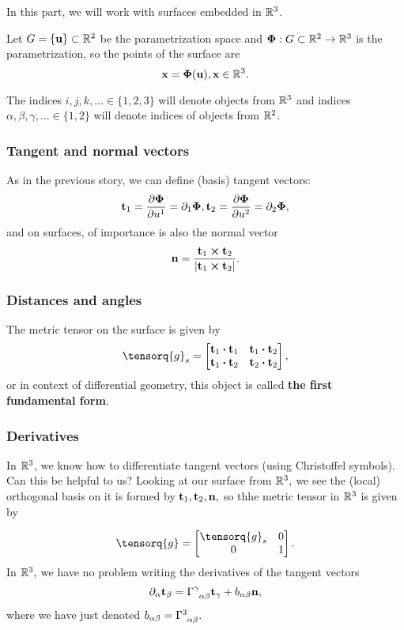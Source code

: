 \documentclass[../main.tex]{subfiles}
\begin{document}
In this part, we will work with surfaces embedded in ${\mathbb R}^3$.

Let $G = \{\vb{u}\} \subset {\mathbb R}^2 $ be the parametrization space and $\vb*{\Phi}:G \subset {\mathbb R}^2 \to {\mathbb R}^3$ is the parametrization, so the points of the surface are
\[
	\vb{x}=\vb*{\Phi}\qty(\vb{u}), \vb{x} \in {\mathbb R}^3.
\]

\begin{definition}
	The indices $i,j,k, \dots \in \{1,2,3\}$ will denote objects from ${\mathbb R}^3$ and indices $\alpha, \beta, \gamma, \dots \in \{1,2\}$ will denote indices of objects from ${\mathbb R}^2$.
\end{definition}

\subsubsection{Tangent and normal vectors}
\label{sec:tangent_normal_vectors}
As in the previous story, we can define (basis) tangent vectors:
\[
	\vb{t}_1 = \pdv{\vb*{\Phi}}{u^1} = \partial_{1} \vb*{\Phi}, \vb{t}_2 = \pdv{\vb*{\Phi}}{u^2} = \partial_{2} \vb*{\Phi},
\]
and on surfaces, of importance is also the normal vector
\[
	\vb{n}=\frac{\vb{t}_1 \cross \vb{t}_2}{\abs{\vb{t}_1 \cross \vb{t}_2}}.
\]

\subsubsection{Distances and angles}
\label{sec:distances_angles}

The metric tensor on the surface is given by
\[
	\tensorq{g}_s = \begin{bmatrix} \vb{t}_1 \vdot \vb{t}_1 & \vb{t}_1 \vdot \vb{t}_2 \\ \vb{t}_1 \vdot \vb{t}_2 & \vb{t}_2 \vdot \vb{t}_2 \end{bmatrix},
\]
or in context of differential geometry, this object is called \textbf{the first fundamental form}.

\subsubsection{Derivatives}
\label{sec:derivatives_on_surfaces}
In ${\mathbb R}^3$, we know how to differentiate tangent vectors (using Christoffel symbols). Can this be helpful to us?
Looking at our surface from ${\mathbb R}^{3},$ we see the (local) orthogonal basis on it is formed by $\vb{t}_1, \vb{t}_2, \vb{n},$ so thhe metric tensor in ${\mathbb R}^3$ is given by 

\[
	\tensorq{g} = 
	\begin{bmatrix}
		\tensorq{g}_s & 0 \\
		0 & 1 
	\end{bmatrix}.
\]
In ${\mathbb R}^{3},$ we have no problem writing the derivatives of the tangent vectors
\[
	\partial_{\alpha} \vb{t}_{\beta} = \Gamma \indices{^\gamma_{\alpha \beta}} \vb{t}_{\gamma}+b_{\alpha \beta} \vb{n},
\]
where we have just denoted $b_{\alpha \beta} = \Gamma \indices{^3 _{\alpha \beta}}.$
\end{document}
